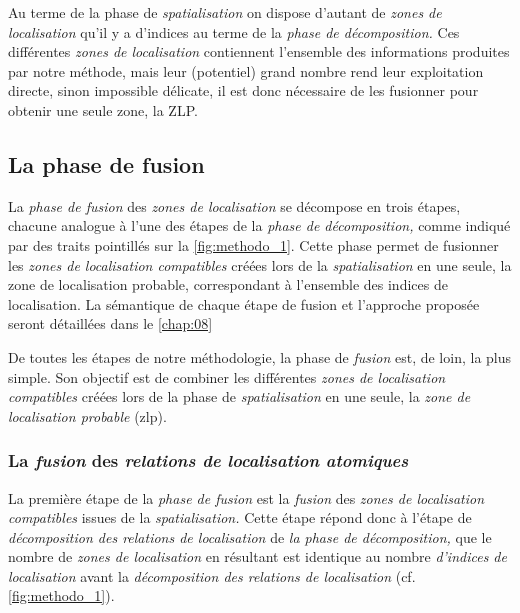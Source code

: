 Au terme de la phase de \emph{spatialisation} on dispose d'autant de
\emph{zones de localisation} qu'il y a d'indices au terme de la
\emph{phase de décomposition.} Ces différentes \emph{zones de
  localisation} contiennent l'ensemble des informations produites par
notre méthode, mais leur (potentiel) grand nombre rend leur
exploitation directe, sinon impossible délicate, il est donc
nécessaire de les fusionner pour obtenir une seule zone, la ZLP.

\subsection{La phase de fusion}

La \emph{phase de fusion} des \emph{zones de localisation} se
décompose en trois étapes, chacune analogue à l'une des étapes de la
\emph{phase de décomposition,} comme indiqué par des traits pointillés
sur la \autoref{fig:methodo_1}. Cette phase permet de fusionner les
\emph{zones de localisation compatibles} créées lors de la
\emph{spatialisation} en une seule, la zone de localisation probable,
correspondant à l'ensemble des indices de localisation. La sémantique
de chaque étape de fusion et l'approche proposée seront détaillées
dans le \autoref{chap:08}

De toutes les étapes de notre méthodologie, la phase de \emph{fusion}
est, de loin, la plus simple. Son objectif est de combiner les
différentes \emph{zones de localisation compatibles} créées lors de la
phase de \emph{spatialisation} en une seule, la \emph{zone de
  localisation probable} (\ac{zlp}).

\subsubsection{La \emph{fusion} des \emph{relations de localisation
    atomiques}}

La première étape de la \emph{phase de fusion} est la \emph{fusion}
des \emph{zones de localisation compatibles} issues de la
\emph{spatialisation.} Cette étape répond donc à l'étape de
\emph{décomposition des relations de localisation} de \emph{la phase
  de décomposition,} \ie que le nombre de \emph{zones de localisation}
en résultant est identique au nombre \emph{d'indices de localisation}
avant la \emph{décomposition des relations de localisation}
(cf. \autoref{fig:methodo_1}).

